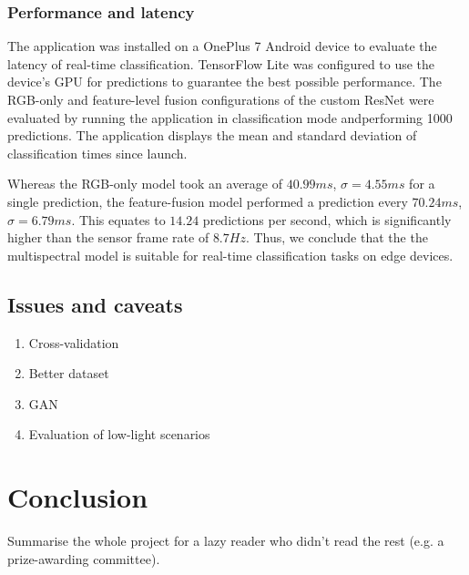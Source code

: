 \documentclass{l4proj}
\begin{document}
\subsection{Performance and latency}

The application was installed on a OnePlus 7 Android device to evaluate the latency of real-time classification. TensorFlow Lite was configured to use the device's GPU for predictions to guarantee the best possible performance. The RGB-only and feature-level fusion configurations of the custom ResNet were evaluated by running the application in classification mode andperforming 1000 predictions. The application displays the mean and standard deviation of classification times since launch. 

Whereas the RGB-only model took an average of $40.99 ms$, $\sigma = 4.55 ms$ for a single prediction, the feature-fusion model performed a prediction every $70.24 ms$, $\sigma = 6.79 ms$. This equates to $14.24$ predictions per second, which is significantly higher than the sensor frame rate of $8.7 Hz$. Thus, we conclude that the the multispectral model is suitable for real-time classification tasks on edge devices.


\section{Issues and caveats}

\begin{enumerate}
  \item Cross-validation
  \item Better dataset
  \item GAN
  \item Evaluation of low-light scenarios
\end{enumerate}

\chapter{Conclusion}    
Summarise the whole project for a lazy reader who didn't read the rest (e.g. a prize-awarding committee).

\end{document}
